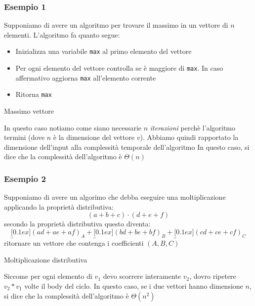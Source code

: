 \subsubsection{Esempio 1}
Supponiamo di avere un algoritmo per trovare il massimo in un vettore di $ n $ elementi. L'algoritmo fa quanto segue:
\begin{itemize}
	\item Inizializza una variabile \verb|max| al primo elemento del vettore
	\item Per ogni elemento del vettore controlla se è maggiore di \verb|max|. In caso affermativo aggiorna \verb|max| all'elemento corrente
	\item Ritorna \verb|max|
\end{itemize}
\begin{algoritmo*}{Massimo vettore}
	\begin{algorithm}[H]
	\end{algorithm}
\end{algoritmo*}
In questo caso notiamo come siano necessarie $ n $ \textit{iterazioni} perchè l'algoritmo termini (dove $ n $ è la dimensione del vettore $ v $). Abbiamo quindi rapportato la dimensione dell'input alla complessità temporale dell'algoritmo
\vskip3mm
In questo caso, si dice che la complessità dell'algoritmo è $ \Theta \left(n\right) $

\subsubsection{Esempio 2}
Supponiamo di avere un algorimo che debba eseguire una moltiplicazione applicando la proprietà distributiva:
\[
	\left(a + b + c\right)\cdot \left(d + e + f\right)
\]
secondo la proprietà distributiva questo diventa:
\[
	\underbracket[0.1ex]{\left(ad + ae + af\right)}_{A}+ \underbracket[0.1ex]{\left(bd + be + bf\right)}_{B} + \underbracket[0.1ex]{\left(cd + ce + cf\right)}_{C}
\]
ritornare un vettore che contenga i coefficienti $ \left(A,B,C\right) $

\begin{algoritmo*}{Moltiplicazione distributiva}
	\begin{algorithm}[H]
	\end{algorithm}
\end{algoritmo*}
Siccome per ogni elemento di $ v_1 $ devo scorrere interamente $ v_2 $, dovro ripetere $ v_2 * v_1 $ volte il body del ciclo.
\vskip3mm
In questo caso, se i due vettori hanno dimensione $ n $, si dice che la complessità dell'algoritmo è $ \Theta \left(n^2 \right) $

